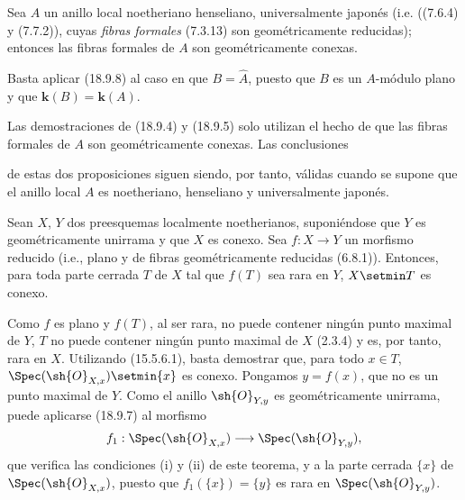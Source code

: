 \begin{corollary}[18.9.9]
\label{IV.18.9.9}
Sea $A$ un anillo local noetheriano henseliano, universalmente japonés \textup{(i.e. ((7.6.4) y (7.7.2)), cuyas \emph{fibras formales} (7.3.13) son geométricamente reducidas)}; entonces las fibras formales de $A$ son geométricamente conexas.
\end{corollary}

Basta aplicar (18.9.8) al caso en que $B=\widehat A$, puesto que $B$ es un $A$-módulo plano y que $\boldsymbol k(B)=\boldsymbol k(A)$.

\begin{remark}[18.9.10]
\label{IV.18.9.10}
Las demostraciones de (18.9.4) y (18.9.5) solo utilizan el hecho de que las fibras formales de $A$ son geométricamente conexas. Las conclusiones


de estas dos proposiciones siguen siendo, por tanto, válidas cuando se supone que el anillo local $A$ es noetheriano, henseliano y universalmente japonés.
\end{remark}

\begin{corollary}[18.9.11]
\label{IV.18.9.11}
Sean $X$, $Y$ dos preesquemas localmente noetherianos, suponiéndose que $Y$ es geométricamente unirrama y que $X$ es conexo. Sea $f:X\to Y$ un morfismo reducido \textup{(i.e., plano y de fibras geométricamente reducidas (6.8.1))}. Entonces, para toda parte cerrada $T$ de $X$ tal que $f(T)$ sea rara en $Y$, $X\setmin T$ es conexo.
\end{corollary}

Como $f$ es plano y $f(T)$, al ser rara, no puede contener ningún punto maximal de $Y$, $T$ no puede contener ningún punto maximal de $X$ (2.3.4) y es, por tanto, rara en $X$. Utilizando (15.5.6.1), basta demostrar que, para todo $x\in T$, $\Spec(\sh{O}_{X,x})\setmin\{x\}$ es conexo. Pongamos $y=f(x)$, que no es un punto maximal de $Y$. Como el anillo $\sh{O}_{Y,y}$ es geométricamente unirrama, puede aplicarse (18.9.7) al morfismo
\[
  f_1:\Spec(\sh{O}_{X,x})\longrightarrow\Spec(\sh{O}_{Y,y}),
\]
que verifica las condiciones (i) y (ii) de este teorema, y a la parte cerrada $\{x\}$ de $\Spec(\sh{O}_{X,x})$,
puesto que $f_1(\{x\})=\{y\}$ es rara en $\Spec(\sh{O}_{Y,y})$.
